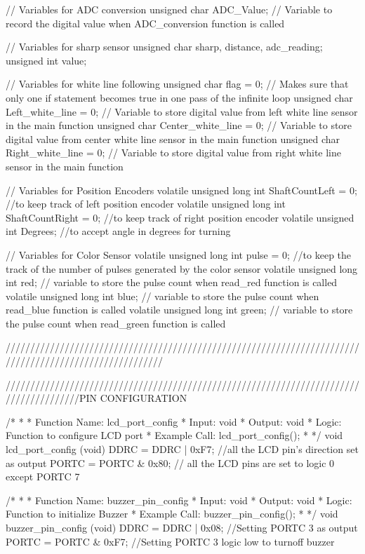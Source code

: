 // Variables for ADC conversion
unsigned char ADC_Value;    // Variable to record the digital value when ADC_conversion function is called

// Variables for sharp sensor
unsigned char sharp, distance, adc_reading;
unsigned int value;

// Variables for white line following
unsigned char flag = 0;     // Makes sure that only one if statement becomes true in one pass of the infinite loop
unsigned char Left_white_line = 0;   // Variable to store digital value from left white line sensor in the main function
unsigned char Center_white_line = 0; // Variable to store digital value from center white line sensor in the main function
unsigned char Right_white_line = 0;  // Variable to store digital value from right white line sensor in the main function

// Variables for Position Encoders
volatile unsigned long int ShaftCountLeft = 0;  //to keep track of left position encoder
volatile unsigned long int ShaftCountRight = 0; //to keep track of right position encoder
volatile unsigned int Degrees;                  //to accept angle in degrees for turning

// Variables for Color Sensor
volatile unsigned long int pulse = 0; //to keep the track of the number of pulses generated by the color sensor
volatile unsigned long int red;       // variable to store the pulse count when read_red function is called
volatile unsigned long int blue;      // variable to store the pulse count when read_blue function is called
volatile unsigned long int green;     // variable to store the pulse count when read_green function is called

////////////////////////////////////////////////////////////////////////////////////////////////////////


///////////////////////////////////////////////////////////////////////////////////////PIN CONFIGURATION

/*
 *
* Function Name: lcd_port_config
* Input: void
* Output: void
* Logic: Function to configure LCD port
* Example Call: lcd_port_config();
*
*/
void lcd_port_config (void)
{
	DDRC = DDRC | 0xF7; //all the LCD pin's direction set as output
	PORTC = PORTC & 0x80; // all the LCD pins are set to logic 0 except PORTC 7
}

/*
*
* Function Name: buzzer_pin_config
* Input: void
* Output: void
* Logic: Function to initialize Buzzer
* Example Call: buzzer_pin_config();
*
*/
void buzzer_pin_config (void)
{
	DDRC = DDRC | 0x08;		//Setting PORTC 3 as output
	PORTC = PORTC & 0xF7;		//Setting PORTC 3 logic low to turnoff buzzer
}

